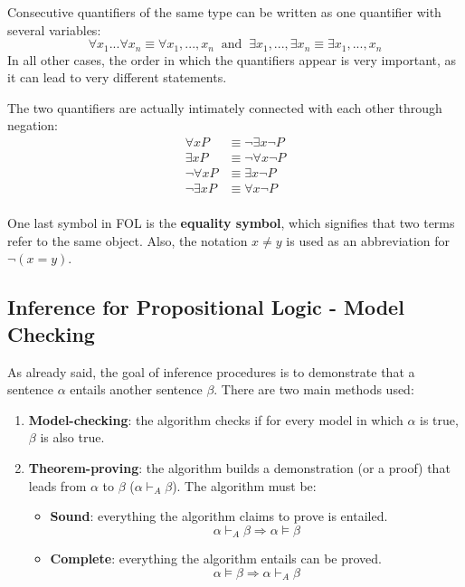 \documentclass{article}
\begin{document}
Consecutive quantifiers of the same type can be written as one quantifier with several variables:
\[\forall x_1 ... \forall x_n \equiv \forall x_1,...,x_n \;\;\text{and}\;\; \exists x_1, ..., \exists x_n \equiv \exists x_1,...,x_n\]
In all other cases, the order in which the quantifiers appear is very important, as it can lead to very different statements.

The two quantifiers are actually intimately connected with each other through negation:
\begin{align*}
    \forall x P & \equiv \neg\exists x \neg P \\
    \exists x P & \equiv \neg\forall x \neg P \\
    \neg\forall x P & \equiv \exists x \neg P \\
    \neg\exists x P & \equiv \forall x \neg P \\
\end{align*}

One last symbol in FOL is the \textbf{equality symbol}, which signifies that two terms refer to the same object. Also, the notation $x\neq y$ is used as an abbreviation for $\neg(x=y)$.

\subsection{Inference for Propositional Logic - Model Checking}
As already said, the goal of inference procedures is to demonstrate that a sentence $\alpha$ entails another sentence $\beta$. There are two main methods used:
\begin{enumerate}
    \item \textbf{Model-checking}: the algorithm checks if for every model in which $\alpha$ is true, $\beta$ is also true.
    \item \textbf{Theorem-proving}: the algorithm builds a demonstration (or a proof) that leads from $\alpha$ to $\beta$ ($\alpha \vdash_A \beta$). The algorithm must be:
    \begin{itemize}
        \item \textbf{Sound}: everything the algorithm claims to prove is entailed.
            \[\alpha \vdash_A\beta\Rightarrow\alpha\models\beta\]
        \item \textbf{Complete}: everything the algorithm entails can be proved. 
            \[\alpha\models\beta\Rightarrow\alpha\vdash_A\beta\]
    \end{itemize}        
\end{enumerate}
\end{document}
